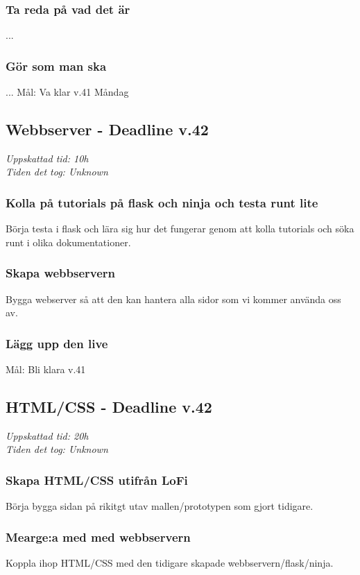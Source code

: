 \documentclass{TDP003mall}
\begin{document}
\subsubsection{Ta reda på vad det är}
...

\subsubsection{Gör som man ska}
...
Mål: Va klar v.41 Måndag

\subsection{Webbserver - Deadline v.42}
\textit{Uppskattad tid: 10h \\ Tiden det tog: Unknown}

\subsubsection{Kolla på tutorials på flask och ninja och testa runt lite}
Börja testa i flask och lära sig hur det fungerar genom att kolla tutorials och söka runt i olika dokumentationer.

\subsubsection{Skapa webbservern}
Bygga webserver så att den kan hantera alla sidor som vi kommer använda oss av.

\subsubsection{Lägg upp den live}
Mål: Bli klara v.41

\subsection{HTML/CSS - Deadline v.42}
\textit{Uppskattad tid: 20h \\ Tiden det tog: Unknown}

\subsubsection{Skapa HTML/CSS utifrån LoFi}
Börja bygga sidan på rikitgt utav mallen/prototypen som gjort tidigare.

\subsubsection{Mearge:a med med webbservern}
Koppla ihop HTML/CSS med den tidigare skapade webbservern/flask/ninja.
\end{document}
